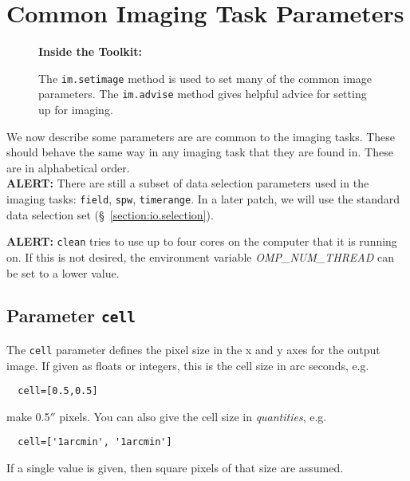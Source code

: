 \section{Common Imaging Task Parameters}
\label{section:im.pars}

\begin{wrapfigure}{r}{2.5in}
  \begin{boxedminipage}{2.5in}
     \centerline{\bf Inside the Toolkit:}
     The {\tt im.setimage} method is used to set many of the
     common image parameters.  The {\tt im.advise} method
     gives helpful advice for setting up for imaging.
  \end{boxedminipage}
\end{wrapfigure}

We now describe some parameters are are common to the imaging
tasks.  These should behave the same way in any imaging task
that they are found in.  These are in alphabetical order.\\[1cm]

{\bf ALERT:} There are still a subset of
data selection parameters used in the imaging tasks:
{\tt field}, {\tt spw}, {\tt timerange}.
In a later patch, we will use 
the standard data selection set (\S~\ref{section:io.selection}).


{\bf ALERT:} {\tt clean} tries to use up to four cores on the computer that
it is running on. If this is not desired, the environment variable
{\it OMP\_NUM\_THREAD} can be set to a lower value. 


\subsection{Parameter {\tt cell} }
\label{section:im.pars.cell}

The {\tt cell} parameter defines the pixel size in the
x and y axes for the output
image.  If given as floats or integers, this is the cell size
in arc seconds, e.g.
\small
\begin{verbatim}
  cell=[0.5,0.5]
\end{verbatim}
\normalsize
make 0.5$''$ pixels.
You can also give the cell size in {\it quantities}, e.g.
\small
\begin{verbatim}
  cell=['1arcmin', '1arcmin']
\end{verbatim}
\normalsize
If a single value is given, then square pixels of that size
are assumed.

